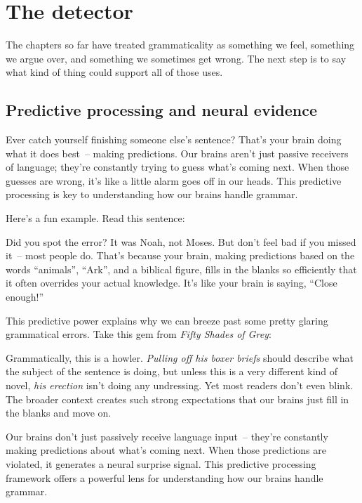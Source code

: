 \section{The detector}

The chapters so far have treated grammaticality as something we feel, something we argue over, and something we sometimes get wrong. The next step is to say what kind of thing could support all of those uses.

\subsection{Predictive processing and neural evidence}

Ever catch yourself finishing someone else's sentence? That's your brain doing what it does best~-- making predictions. Our brains aren't just passive receivers of language; they're constantly trying to guess what's coming next. When those guesses are wrong, it's like a little alarm goes off in our heads. This predictive processing is key to understanding how our brains handle grammar.

Here's a fun example. Read this sentence:

\label{ex:moses}
\z

Did you spot the error? It was Noah, not Moses. But don't feel bad if you missed it~-- most people do. That's because your brain, making predictions based on the words ``animals'', ``Ark'', and a biblical figure, fills in the blanks so efficiently that it often overrides your actual knowledge. It's like your brain is saying, ``Close enough!''

This predictive power explains why we can breeze past some pretty glaring grammatical errors. Take this gem from \textit{Fifty Shades of Grey}:

\label{ex:erection-neuro}
\z

Grammatically, this is a howler. \textit{Pulling off his boxer briefs} should describe what the subject of the sentence is doing, but unless this is a very different kind of novel, \textit{his erection} isn't doing any undressing. Yet most readers don't even blink. The broader context creates such strong expectations that our brains just fill in the blanks and move on.

Our brains don't just passively receive language input~-- they're constantly making predictions about what's coming next. When those predictions are violated, it generates a neural surprise signal. This predictive processing framework offers a powerful lens for understanding how our brains handle grammar.

